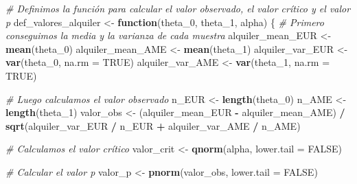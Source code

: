 \documentclass[
]{article}
\newenvironment{Shaded}{\begin{snugshade}}{\end{snugshade}}
\newcommand{\AttributeTok}[1]{\textcolor[rgb]{0.13,0.29,0.53}{#1}}
\newcommand{\CommentTok}[1]{\textcolor[rgb]{0.56,0.35,0.01}{\textit{#1}}}
\newcommand{\ConstantTok}[1]{\textcolor[rgb]{0.56,0.35,0.01}{#1}}
\newcommand{\ControlFlowTok}[1]{\textcolor[rgb]{0.13,0.29,0.53}{\textbf{#1}}}
\newcommand{\FunctionTok}[1]{\textcolor[rgb]{0.13,0.29,0.53}{\textbf{#1}}}
\newcommand{\NormalTok}[1]{#1}
\newcommand{\OtherTok}[1]{\textcolor[rgb]{0.56,0.35,0.01}{#1}}
\newcommand{\SpecialCharTok}[1]{\textcolor[rgb]{0.81,0.36,0.00}{\textbf{#1}}}
\begin{document}
\begin{Shaded}
\begin{Highlighting}[]
\CommentTok{\# Definimos la función para calcular el valor observado, el valor crítico y el valor p}
\NormalTok{def\_valores\_alquiler }\OtherTok{\textless{}{-}} \ControlFlowTok{function}\NormalTok{(theta\_0, theta\_1, alpha) \{}
    \CommentTok{\# Primero conseguimos la media y la varianza de cada muestra}
\NormalTok{    alquiler\_mean\_EUR }\OtherTok{\textless{}{-}} \FunctionTok{mean}\NormalTok{(theta\_0)}
\NormalTok{    alquiler\_mean\_AME }\OtherTok{\textless{}{-}} \FunctionTok{mean}\NormalTok{(theta\_1)}
\NormalTok{    alquiler\_var\_EUR }\OtherTok{\textless{}{-}} \FunctionTok{var}\NormalTok{(theta\_0, }\AttributeTok{na.rm =} \ConstantTok{TRUE}\NormalTok{)}
\NormalTok{    alquiler\_var\_AME }\OtherTok{\textless{}{-}} \FunctionTok{var}\NormalTok{(theta\_1, }\AttributeTok{na.rm =} \ConstantTok{TRUE}\NormalTok{)}
    
    \CommentTok{\# Luego calculamos el valor observado}
\NormalTok{    n\_EUR }\OtherTok{\textless{}{-}} \FunctionTok{length}\NormalTok{(theta\_0)}
\NormalTok{    n\_AME }\OtherTok{\textless{}{-}} \FunctionTok{length}\NormalTok{(theta\_1)}
\NormalTok{    valor\_obs }\OtherTok{\textless{}{-}}\NormalTok{ (alquiler\_mean\_EUR }\SpecialCharTok{{-}}\NormalTok{ alquiler\_mean\_AME) }\SpecialCharTok{/} \FunctionTok{sqrt}\NormalTok{(alquiler\_var\_EUR }\SpecialCharTok{/}\NormalTok{ n\_EUR }\SpecialCharTok{+}\NormalTok{ alquiler\_var\_AME }\SpecialCharTok{/}\NormalTok{ n\_AME) }
    
    \CommentTok{\# Calculamos el valor crítico}
\NormalTok{    valor\_crit }\OtherTok{\textless{}{-}} \FunctionTok{qnorm}\NormalTok{(alpha, }\AttributeTok{lower.tail =} \ConstantTok{FALSE}\NormalTok{) }
    
    \CommentTok{\# Calcular el valor p}
\NormalTok{    valor\_p }\OtherTok{\textless{}{-}} \FunctionTok{pnorm}\NormalTok{(valor\_obs, }\AttributeTok{lower.tail =} \ConstantTok{FALSE}\NormalTok{) }
    

\end{Highlighting}
\end{Shaded}
\end{document}
